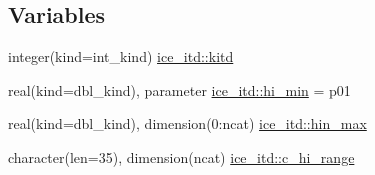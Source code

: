 \subsection*{Variables}
\begin{DoxyCompactItemize}
\item 
integer(kind=int\_\-kind) \hyperlink{namespaceice__itd_abda5299945828ac5cca9a7e6522991e3}{ice\_\-itd::kitd}
\item 
real(kind=dbl\_\-kind), parameter \hyperlink{namespaceice__itd_a096dec1f870d22da21163b6dcacb1d2c}{ice\_\-itd::hi\_\-min} = p01
\item 
real(kind=dbl\_\-kind), dimension(0:ncat) \hyperlink{namespaceice__itd_aa7b9ac33772390c73597dec2ed768aba}{ice\_\-itd::hin\_\-max}
\item 
character(len=35), dimension(ncat) \hyperlink{namespaceice__itd_a679cef320723f15b41bdfc5811701cea}{ice\_\-itd::c\_\-hi\_\-range}
\end{DoxyCompactItemize}
